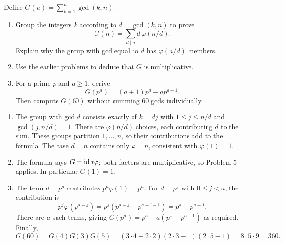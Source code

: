 \instructorbreak
{}
Define $G(n)=\sum_{k=1}^n\gcd(k,n)$.
\begin{enumerate}
  \item Group the integers $k$ according to $d=\gcd(k,n)$ to prove
  \[
    G(n)=\sum_{d\mid n}d\,\varphi(n/d).
  \]
  Explain why the group with gcd equal to $d$ has $\varphi(n/d)$
  members. 
  \item Use the earlier problems to deduce that $G$ is multiplicative.
  \item For a prime $p$ and $a\ge1$, derive
  \[
    G(p^a)=(a+1)p^a-a p^{a-1}.
  \]
  Then compute $G(60)$ without summing 60 gcds individually.
\end{enumerate}
\begin{solution}
\begin{enumerate}
  \item The group with gcd $d$ consists exactly of $k=dj$ with
  $1\le j\le n/d$ and $\gcd(j,n/d)=1$. There are
  $\varphi(n/d)$ choices, each contributing $d$ to the sum.
  These groups partition $1,\ldots,n$, so their contributions add
  to the formula. The case $d=n$ contains only $k=n$, consistent
  with $\varphi(1)=1$.
  \item The formula says $G=\operatorname{id}*\varphi$; both factors are
  multiplicative, so Problem 5 applies. In particular $G(1)=1$.
  \item The term $d=p^a$ contributes $p^a\varphi(1)=p^a$.
  For $d=p^j$ with $0\le j<a$, the contribution is
  \[
    p^j\varphi(p^{a-j})
      =p^j(p^{a-j}-p^{a-j-1})=p^a-p^{a-1}.
  \]
  There are $a$ such terms, giving
  $G(p^a)=p^a+a(p^a-p^{a-1})$ as required. Finally,
  \[
    G(60)=G(4)G(3)G(5)
      =(3\cdot4-2\cdot2)(2\cdot3-1)(2\cdot5-1)
      =8\cdot5\cdot9=360.
  \]
\end{enumerate}
\end{solution}

